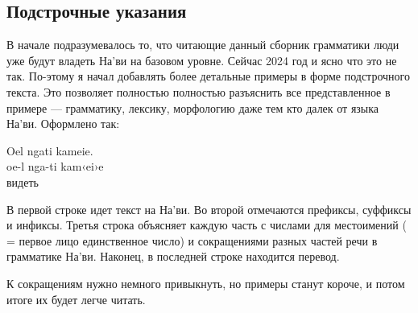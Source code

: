 \subsection{Подстрочные указания}
В начале подразумевалось то, что читающие данный сборник грамматики люди уже будут владеть На'ви на базовом уровне. Сейчас 2024 год и ясно что это не так.
По-этому я начал добавлять более детальные примеры в форме
подстрочного текста. Это позволяет полностью полностью
разъяснить все представленное в примере — грамматику, лексику,
морфологию даже тем кто далек от языка На'ви. Оформлено так:

\begin{interlin}
 \glll Oel ngati kameie. \\
     oe-l nga-ti kam‹ei›e \\
       видеть \\
\end{interlin}

\noindent В первой строке идет текст на На'ви. Во
второй отмечаются префиксы, суффиксы и инфиксы. Третья строка
объясняет каждую часть  с числами для местоимений ( =
первое лицо
единственное число) и сокращениями разных частей речи в
грамматике На'ви. Наконец, в последней строке находится перевод.

К сокращениям нужно немного привыкнуть, но примеры станут короче, и потом итоге их будет легче читать.

